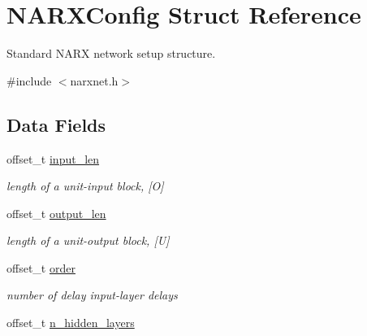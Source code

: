 \hypertarget{struct_n_a_r_x_config}{\section{N\-A\-R\-X\-Config Struct Reference}
\label{struct_n_a_r_x_config}
}


Standard N\-A\-R\-X network setup structure.  




{\ttfamily \#include $<$narxnet.\-h$>$}

\subsection*{Data Fields}
\begin{DoxyCompactItemize}
\item 
\hypertarget{struct_n_a_r_x_config_aa4b2d55a4fed85c80032bf017c399777}{offset\-\_\-t \hyperlink{struct_n_a_r_x_config_aa4b2d55a4fed85c80032bf017c399777}{input\-\_\-len}}\label{struct_n_a_r_x_config_aa4b2d55a4fed85c80032bf017c399777}

\begin{DoxyCompactList}\small\item\em length of a unit-\/input block, \mbox{[}O\mbox{]} \end{DoxyCompactList}\item 
\hypertarget{struct_n_a_r_x_config_aa25870e43cd5b7e8dae7e6533ca1c905}{offset\-\_\-t \hyperlink{struct_n_a_r_x_config_aa25870e43cd5b7e8dae7e6533ca1c905}{output\-\_\-len}}\label{struct_n_a_r_x_config_aa25870e43cd5b7e8dae7e6533ca1c905}

\begin{DoxyCompactList}\small\item\em length of a unit-\/output block, \mbox{[}U\mbox{]} \end{DoxyCompactList}\item 
\hypertarget{struct_n_a_r_x_config_a756f35a3700e4cb0b63480cf0e9bfbcb}{offset\-\_\-t \hyperlink{struct_n_a_r_x_config_a756f35a3700e4cb0b63480cf0e9bfbcb}{order}}\label{struct_n_a_r_x_config_a756f35a3700e4cb0b63480cf0e9bfbcb}

\begin{DoxyCompactList}\small\item\em number of delay input-\/layer delays \end{DoxyCompactList}\item 
\hypertarget{struct_n_a_r_x_config_ad7f9aa9b987e241cfa5ccd5c7861168c}{offset\-\_\-t \hyperlink{struct_n_a_r_x_config_ad7f9aa9b987e241cfa5ccd5c7861168c}{n\-\_\-hidden\-\_\-layers}}\label{struct_n_a_r_x_config_ad7f9aa9b987e241cfa5ccd5c7861168c}


\end{DoxyCompactItemize}
